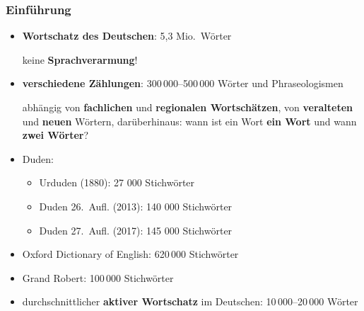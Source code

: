 \begin{frame}
\frametitle{Einführung}

\begin{itemize}
	\item \textbf{Wortschatz des Deutschen}: 5,3 Mio.\ Wörter
	
	\ras keine \textbf{Sprachverarmung}!
	
	\item \textbf{verschiedene Zählungen}: 300\,000--500\,000 Wörter und Phraseologismen 
	
	abhängig von \textbf{fachlichen} und \textbf{regionalen Wortschätzen}, von \textbf{veralteten} und \textbf{neuen} Wörtern, darüberhinaus: wann ist ein Wort \textbf{ein Wort} und wann \textbf{zwei Wörter}?
	
\medskip 
\pause 
	
	\item Duden:
	\begin{itemize}
		\item Urduden (1880): 27 000 Stichwörter
		\item Duden 26.\ Aufl. (2013): 140 000 Stichwörter
		\item Duden 27.\ Aufl. (2017): 145 000 Stichwörter
	\end{itemize}	
	
	\item Oxford Dictionary of English: 620\,000 Stichwörter
	\item Grand Robert: 100\,000 Stichwörter
	
\medskip 
\pause 
	
	\item durchschnittlicher \textbf{aktiver Wortschatz} im Deutschen:
	10\,000--20\,000 Wörter
	
\end{itemize}

\end{frame}



